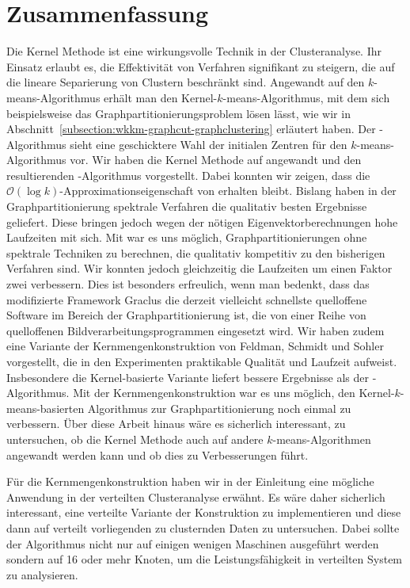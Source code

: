 \section{Zusammenfassung}
\label{section:conclusion}

Die Kernel Methode ist eine wirkungsvolle Technik in der Clusteranalyse. Ihr Einsatz erlaubt es, die Effektivität von Verfahren
signifikant zu steigern, die auf die lineare Separierung von Clustern beschränkt sind. Angewandt auf den $k$-means-Algorithmus
erhält man den Kernel-$k$-means-Algorithmus, mit dem sich beispielsweise das Graph\-partitionierungsproblem lösen lässt, wie wir
in Abschnitt~\ref{subsection:wkkm-graphcut-graphclustering} erläutert haben.
\absatz
Der \kmpp-Algorithmus sieht eine geschicktere Wahl der initialen Zentren für den $k$-means-Algorithmus vor.
Wir haben die Kernel Methode auf \kmpp{} angewandt und den resultierenden \kkmpp-Algorithmus vorgestellt.
Dabei konnten wir zeigen, dass die $\mathcal{O}(\log k)$-Approximationseigenschaft von \kmpp{} erhalten bleibt.
Bislang haben in der Graphpartitionierung spektrale Verfahren die qualitativ besten Ergebnisse geliefert.
Diese bringen jedoch wegen der nötigen Eigenvektorberechnungen hohe Laufzeiten mit sich.
Mit \kkmpp{} war es uns möglich, Graphpartitionierungen ohne spektrale Techniken zu berechnen, die qualitativ kompetitiv zu
den bisherigen Verfahren sind. Wir konnten jedoch gleichzeitig die Laufzeiten um einen Faktor zwei verbessern. Dies ist besonders
erfreulich, wenn man bedenkt, dass das modifizierte Framework Graclus die derzeit vielleicht schnellste quelloffene
Software im Bereich der Graphpartitionierung ist, die von einer Reihe von quelloffenen Bildverarbeitungsprogrammen eingesetzt wird.
\absatz
Wir haben zudem eine Variante der Kernmengenkonstruktion von Feldman, Schmidt und Sohler~\cite{FeldmanSS13} vorgestellt,
die in den Experimenten praktikable Qualität und Laufzeit aufweist. Insbesondere die Kernel-basierte Variante liefert bessere
Ergebnisse als der \kmpp-Algorithmus. Mit der Kernmengenkonstruktion war es uns möglich, den Kernel-$k$-means-basierten 
Algorithmus zur Graphpartitionierung noch einmal zu verbessern.
\absatz
Über diese Arbeit hinaus wäre es sicherlich interessant, zu untersuchen, ob die Kernel Methode auch auf andere $k$-means-Algorithmen
angewandt werden kann und ob dies zu Verbesserungen führt.

Für die Kernmengenkonstruktion haben wir in der Einleitung eine mögliche Anwendung in der verteilten Clusteranalyse erwähnt.
Es wäre daher sicherlich interessant, eine verteilte Variante der Konstruktion zu implementieren und diese dann auf verteilt
vorliegenden zu clusternden Daten zu untersuchen. Dabei sollte der Algorithmus nicht nur auf einigen wenigen Maschinen ausgeführt
werden sondern auf 16 oder mehr Knoten, um die Leistungsfähigkeit in verteilten System zu analysieren.